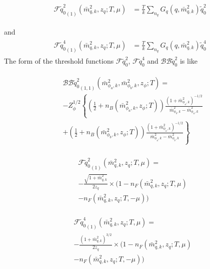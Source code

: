 \documentclass[%
reprint,
superscriptaddress,
showpacs,preprintnumbers,
 amsmath,amssymb,
 aps,
prd,
]{revtex4-1}
\begin{document}
\begin{align}
\begin{split}
{\mathcal{F}\tilde{q}_0^2}_{(1)}(\bar{m}^{2}_{q,k},z_q;T,\mu)&=\frac{T}{k}\sum_{n_q}G_q(q,\bar{m}^{2}_{q,k})\tilde{q}_0^2
\end{split}
\end{align} 
 
and
\begin{align}
\begin{split}
{\mathcal{F}\tilde{q}_0^4}_{(1)}(\bar{m}^{2}_{q,k},z_q;T,\mu)&=\frac{T}{k}\sum_{n_q}G_q(q,\bar{m}^{2}_{q,k})\tilde{q}_0^4
\end{split}
\end{align} 
 The form of the threshold functions 
$\mathcal{F}\tilde{q}_0^2$,  $\mathcal{F}\tilde{q}_0^4$ and $\mathcal{BB}\tilde{q}_0^2$ is like



\begin{align}
\begin{split}
&{\mathcal{BB}\tilde{q}_0^2}_{(1,1)}(\bar{m}^{2}_{\phi_a,k},\bar{m}^{2}_{\phi_b,k},z_\phi;T)=\\
&-Z_\phi^{1/2}\left\{ \left( 
\frac{1}{2}+n_B(\bar{m}^{2}_{\phi_a,k},z_\phi;T) \right)\frac{(1+\bar{m}^{2}_{\phi_a,k})^{-1/2}}{\bar{m}^{2}_{\phi_b,k}-
\bar{m}^{2}_{\phi_a,k}}\right.\\
&\left.+\left( \frac{1}{2}+n_B(\bar{m}^{2}_{\phi_b,k},z_\phi;T) \right)\frac{(1+\bar{m}^{2}_{\phi_a,k})^{-1/2}}
{\bar{m}^{2}_{\phi_a,k}-\bar{m}^{2}_{\phi_b,k}}\right\}
\end{split}
\end{align} 


\begin{align}
\begin{split}
&{\mathcal{F}\tilde{q}_0^2}_{(1)}(\bar{m}^{2}_{q,k},z_q;T,\mu)=\\
&-\frac{\sqrt{1+\bar{m}^{2}_{q,k}}}{2z_q}\times(1-n_F(\bar{m}^{2}_{q,k},z_q;T,\mu)\\
&-n_F(\bar{m}^{2}_{q,k},z_q;T,-\mu))
\end{split}
\end{align} 

\begin{align}
\begin{split}
&{\mathcal{F}\tilde{q}_0^4}_{(1)}(\bar{m}^{2}_{q,k},z_q;T,\mu)=\\
&-\frac{(1+\bar{m}^{2}_{q,k})^{3/2}}{2z_q}\times(1-n_F(\bar{m}^{2}_{q,k},z_q;T,\mu)\\
&-n_F(\bar{m}^{2}_{q,k},z_q;T,-\mu))
\end{split}
\end{align} 
\end{document}
